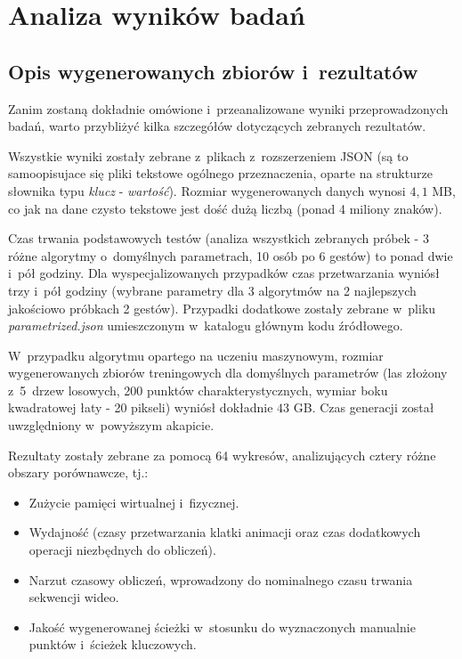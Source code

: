 \chapter{Analiza wyników badań}\label{Chapter_AnalizaRezultatow}

  \section{Opis wygenerowanych zbiorów i~rezultatów}\label{Section_Results}
    Zanim zostaną dokładnie omówione i~przeanalizowane wyniki przeprowadzonych badań, warto przybliżyć kilka szczegółów dotyczących zebranych rezultatów.

    Wszystkie wyniki zostały zebrane z~plikach z~rozszerzeniem JSON (są to samoopisujace się pliki tekstowe ogólnego przeznaczenia, oparte na strukturze słownika typu \textit{klucz} - \textit{wartość}). Rozmiar wygenerowanych danych wynosi $4,1$ MB, co jak na dane czysto tekstowe jest dość dużą liczbą (ponad 4 miliony znaków).

    Czas trwania podstawowych testów (analiza wszystkich zebranych próbek - 3 różne algorytmy o~domyślnych parametrach, 10 osób po 6 gestów) to ponad dwie i~pół godziny. Dla wyspecjalizowanych przypadków czas przetwarzania wyniósł trzy i~pół godziny (wybrane parametry dla 3 algorytmów na 2 najlepszych jakościowo próbkach 2 gestów). Przypadki dodatkowe zostały zebrane w~pliku \textit{parametrized.json} umieszczonym w~katalogu głównym kodu źródłowego.

    W~przypadku algorytmu opartego na uczeniu maszynowym, rozmiar wygenerowanych zbiorów treningowych dla domyślnych parametrów (las złożony z~5~drzew losowych, 200 punktów charakterystycznych, wymiar boku kwadratowej łaty - 20 pikseli) wyniósł dokładnie $43$ GB. Czas generacji został uwzględniony w~powyższym akapicie.

    Rezultaty zostały zebrane za pomocą 64 wykresów, analizujących cztery różne obszary porównawcze, tj.:
    \begin{itemize}
      \item Zużycie pamięci wirtualnej i~fizycznej.
      \item Wydajność (czasy przetwarzania klatki animacji oraz czas dodatkowych operacji niezbędnych do obliczeń).
      \item Narzut czasowy obliczeń, wprowadzony do nominalnego czasu trwania sekwencji wideo.
      \item Jakość wygenerowanej ścieżki w~stosunku do wyznaczonych manualnie punktów i~ścieżek kluczowych.
    \end{itemize}

